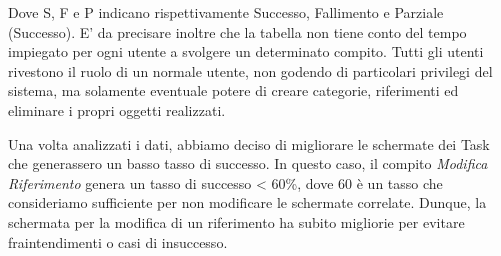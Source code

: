 Dove S, F e P indicano rispettivamente Successo, Fallimento e Parziale (Successo). E' da precisare inoltre che la tabella non tiene conto del tempo impiegato per ogni utente a svolgere un determinato compito. Tutti gli utenti rivestono il ruolo di un normale utente, non godendo di particolari privilegi del sistema, ma solamente eventuale potere di creare categorie, riferimenti ed eliminare i propri oggetti realizzati.

Una volta analizzati i dati, abbiamo deciso di migliorare le schermate dei Task che generassero un basso tasso di successo. In questo caso, il compito \textit{Modifica Riferimento} genera un tasso di successo < 60\%, dove 60 è un tasso che consideriamo sufficiente per non modificare le schermate correlate. Dunque, la schermata per la modifica di un riferimento ha subito migliorie per evitare fraintendimenti o casi di insuccesso. 
